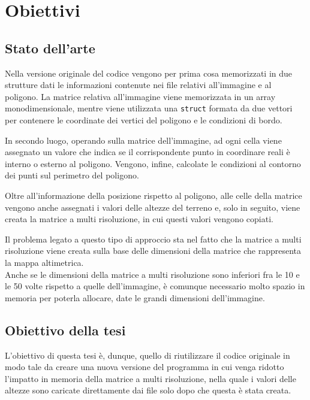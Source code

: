 \chapter{Obiettivi}

	\section{Stato dell'arte}
	Nella versione originale del codice vengono per prima cosa memorizzati in due strutture dati le informazioni contenute nei file relativi all'immagine e al poligono. La matrice relativa all'immagine viene memorizzata in un array monodimensionale, mentre viene utilizzata una \texttt{struct} formata da due vettori per contenere le coordinate dei vertici del poligono e le condizioni di bordo.

	In secondo luogo, operando sulla matrice dell'immagine, ad ogni cella viene assegnato un valore che indica se il corrispondente punto in coordinare reali \`{e} interno o esterno al poligono. Vengono, infine, calcolate le condizioni al contorno dei punti sul perimetro del poligono.

	Oltre all'informazione della posizione rispetto al poligono, alle celle della matrice vengono anche assegnati i valori delle altezze del terreno e, solo in seguito, viene creata la matrice a multi risoluzione, in cui questi valori vengono copiati. 

	Il problema legato a questo tipo di approccio sta nel fatto che la matrice a multi risoluzione viene creata sulla base delle dimensioni della matrice che rappresenta la mappa altimetrica. \\
	Anche se le dimensioni della matrice a multi risoluzione sono inferiori fra le 10 e le 50 volte rispetto a quelle dell'immagine, \`{e} comunque necessario molto spazio in memoria per poterla allocare, date le grandi dimensioni dell'immagine.
	\section{Obiettivo della tesi}
	L'obiettivo di questa tesi \`{e}, dunque, quello di riutilizzare il codice originale in modo tale da creare una nuova versione del programma in cui venga ridotto l'impatto in memoria della matrice a multi risoluzione, nella quale i valori delle altezze sono caricate direttamente dai file solo dopo che questa \`{e} stata creata.
